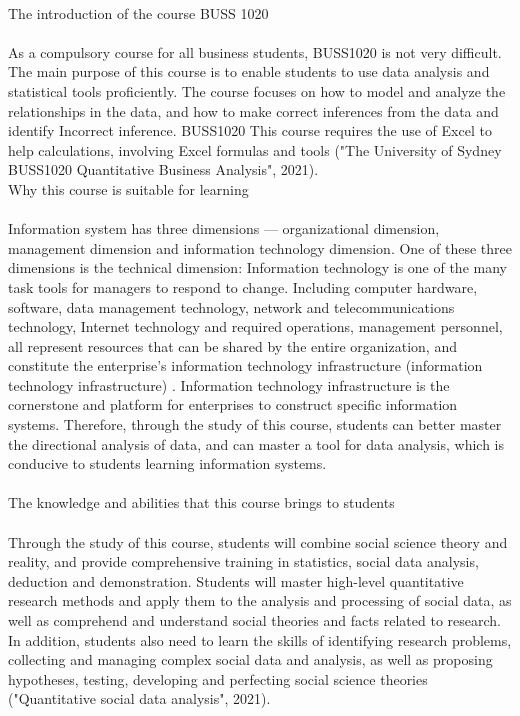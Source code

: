 \documentclass{article}
\begin{document}
	\\
	The introduction of the course BUSS 1020 \\
	\\
	As a compulsory course for all business students, BUSS1020 is not very difficult. The main purpose of this course is to enable students to use data analysis and statistical tools proficiently. The course focuses on how to model and analyze the relationships in the data, and how to make correct inferences from the data and identify Incorrect inference. BUSS1020 This course requires the use of Excel to help calculations, involving Excel formulas and tools ("The University of Sydney BUSS1020 Quantitative Business Analysis", 2021). \\
	Why this course is suitable for learning \\
	\\
	Information system has three dimensions --- organizational dimension, management dimension and information technology dimension. One of these three dimensions is the technical dimension: Information technology is one of the many task tools for managers to respond to change. Including computer hardware, software, data management technology, network and telecommunications technology, Internet technology and required operations, management personnel, all represent resources that can be shared by the entire organization, and constitute the enterprise's information technology infrastructure (information technology infrastructure) . Information technology infrastructure is the cornerstone and platform for enterprises to construct specific information systems. Therefore, through the study of this course, students can better master the directional analysis of data, and can master a tool for data analysis, which is conducive to students learning information systems. \\
	\\
	The knowledge and abilities that this course brings to students \\
	\\
	Through the study of this course, students will combine social science theory and reality, and provide comprehensive training in statistics, social data analysis, deduction and demonstration. Students will master high-level quantitative research methods and apply them to the analysis and processing of social data, as well as comprehend and understand social theories and facts related to research. In addition, students also need to learn the skills of identifying research problems, collecting and managing complex social data and analysis, as well as proposing hypotheses, testing, developing and perfecting social science theories ("Quantitative social data analysis", 2021). \\
\end{document}
